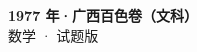 \documentclass[zihao=-4, a4paper]{ctexart}
\begin{document}
\begin{center}
  {\Large\bfseries 1977 年·广西百色卷（文科）}\\[4pt]
  {\large 数学 · 试题版}
\end{center}
\medskip
{}

\end{document}
